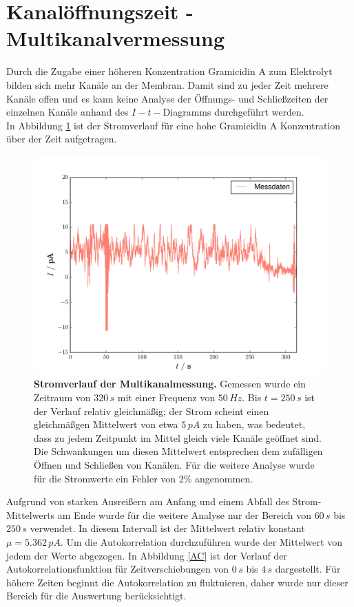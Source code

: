 \documentclass{include/thesisclass3}
\newcommand{\e}[1]{\,\si{#1}}
\begin{document}
\section{Kanalöffnungszeit - Multikanalvermessung}
Durch die Zugabe einer höheren Konzentration Gramicidin A zum Elektrolyt bilden sich mehr Kanäle an der Membran. Damit sind zu jeder Zeit mehrere Kanäle offen und es kann keine Analyse der Öffnungs- und Schließzeiten der einzelnen Kanäle anhand des $I-t-$Diagramms durchgeführt werden. \\In Abbildung \ref{multi} ist der Stromverlauf für eine hohe Gramicidin A Konzentration über der Zeit aufgetragen.
\begin{figure}[H]
\centering
\includegraphics[scale=0.7]{images/multi.pdf}
\caption{\textbf{Stromverlauf der Multikanalmessung.} Gemessen wurde ein Zeitraum von $320\e{s}$ mit einer Frequenz von $50\e{Hz}$. Bis $t = 250\e{s}$ ist der Verlauf relativ gleichmäßig; der Strom scheint einen gleichmäßgen Mittelwert von etwa $5\e{pA}$ zu haben, was bedeutet, dass zu jedem Zeitpunkt im Mittel gleich viele Kanäle geöffnet sind. Die Schwankungen um diesen Mittelwert entsprechen dem zufälligen Öffnen und Schließen von Kanälen. Für die weitere Analyse wurde für die Stromwerte ein Fehler von $2 \%$ angenommen.}
\label{multi}
\end{figure}
Aufgrund von starken Ausreißern am Anfang und einem Abfall des Strom-Mittelwerts am Ende wurde für die weitere Analyse nur der Bereich von $60\e{s}$ bis $250\e{s}$ verwendet. In diesem Intervall ist der Mittelwert relativ konstant $\mu = 5.362\e{pA}$. Um die Autokorrelation durchzuführen wurde der Mittelwert von jedem der Werte abgezogen. In Abbildung \ref{AC} ist der Verlauf der Autokorrelationsfunktion für Zeitverschiebungen von $0\e{s}$ bis $4\e{s}$ dargestellt. Für höhere Zeiten beginnt die Autokorrelation zu fluktuieren, daher wurde nur dieser Bereich für die Auswertung berücksichtigt.
\end{document}
